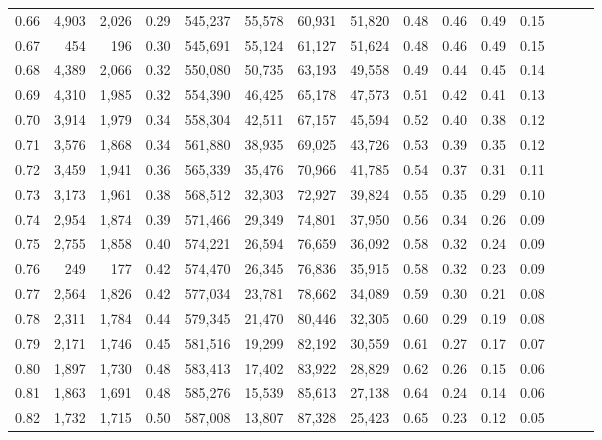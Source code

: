 \begin{tabular}{rrrrrrrrrrrrrrr}
0.66 &   4,903 &  2,026 &  0.29 &  545,237 &   55,578 &   60,931 &   51,820 &  0.48 &  0.46 &  0.49 &      0.15 \\
0.67 &     454 &    196 &  0.30 &  545,691 &   55,124 &   61,127 &   51,624 &  0.48 &  0.46 &  0.49 &      0.15 \\
0.68 &   4,389 &  2,066 &  0.32 &  550,080 &   50,735 &   63,193 &   49,558 &  0.49 &  0.44 &  0.45 &      0.14 \\
0.69 &   4,310 &  1,985 &  0.32 &  554,390 &   46,425 &   65,178 &   47,573 &  0.51 &  0.42 &  0.41 &      0.13 \\
0.70 &   3,914 &  1,979 &  0.34 &  558,304 &   42,511 &   67,157 &   45,594 &  0.52 &  0.40 &  0.38 &      0.12 \\
0.71 &   3,576 &  1,868 &  0.34 &  561,880 &   38,935 &   69,025 &   43,726 &  0.53 &  0.39 &  0.35 &      0.12 \\
0.72 &   3,459 &  1,941 &  0.36 &  565,339 &   35,476 &   70,966 &   41,785 &  0.54 &  0.37 &  0.31 &      0.11 \\
0.73 &   3,173 &  1,961 &  0.38 &  568,512 &   32,303 &   72,927 &   39,824 &  0.55 &  0.35 &  0.29 &      0.10 \\
0.74 &   2,954 &  1,874 &  0.39 &  571,466 &   29,349 &   74,801 &   37,950 &  0.56 &  0.34 &  0.26 &      0.09 \\
0.75 &   2,755 &  1,858 &  0.40 &  574,221 &   26,594 &   76,659 &   36,092 &  0.58 &  0.32 &  0.24 &      0.09 \\
0.76 &     249 &    177 &  0.42 &  574,470 &   26,345 &   76,836 &   35,915 &  0.58 &  0.32 &  0.23 &      0.09 \\
0.77 &   2,564 &  1,826 &  0.42 &  577,034 &   23,781 &   78,662 &   34,089 &  0.59 &  0.30 &  0.21 &      0.08 \\
0.78 &   2,311 &  1,784 &  0.44 &  579,345 &   21,470 &   80,446 &   32,305 &  0.60 &  0.29 &  0.19 &      0.08 \\
0.79 &   2,171 &  1,746 &  0.45 &  581,516 &   19,299 &   82,192 &   30,559 &  0.61 &  0.27 &  0.17 &      0.07 \\
0.80 &   1,897 &  1,730 &  0.48 &  583,413 &   17,402 &   83,922 &   28,829 &  0.62 &  0.26 &  0.15 &      0.06 \\
0.81 &   1,863 &  1,691 &  0.48 &  585,276 &   15,539 &   85,613 &   27,138 &  0.64 &  0.24 &  0.14 &      0.06 \\
0.82 &   1,732 &  1,715 &  0.50 &  587,008 &   13,807 &   87,328 &   25,423 &  0.65 &  0.23 &  0.12 &      0.05 \\

\end{tabular}
